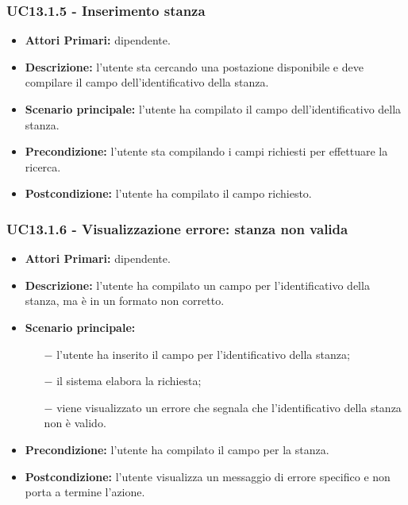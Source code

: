 \subsubsection{ UC13.1.5 - Inserimento stanza }
\begin{itemize}
	\item\textbf{Attori Primari:} dipendente.
	\item\textbf{Descrizione:} l’utente sta cercando una postazione disponibile e deve compilare il campo dell'identificativo della stanza.
	\item\textbf{Scenario principale:} l’utente ha compilato il campo dell'identificativo della stanza.
	\item\textbf{Precondizione:} l’utente sta compilando i campi richiesti per effettuare la ricerca.
	\item\textbf{Postcondizione:} l’utente ha compilato il campo richiesto.
\end{itemize}
\subsubsection{ UC13.1.6 - Visualizzazione errore: stanza non valida }
\begin{itemize}
	\item\textbf{Attori Primari:} dipendente.
	\item\textbf{Descrizione:} l’utente ha compilato un campo per l'identificativo della stanza, ma è in un formato non corretto.
	\item\textbf{Scenario principale:} 
	\begin{itemize}
		\item[$-$] l’utente ha inserito il campo per l'identificativo della stanza;
		\item[$-$] il sistema elabora la richiesta;
		\item[$-$] viene visualizzato un errore che segnala che l'identificativo della stanza non è valido.
	\end{itemize}
	\item\textbf{Precondizione:} l’utente ha compilato il campo per la stanza.
	\item\textbf{Postcondizione:} l’utente visualizza un messaggio di errore specifico e non porta a termine l’azione.
\end{itemize}
